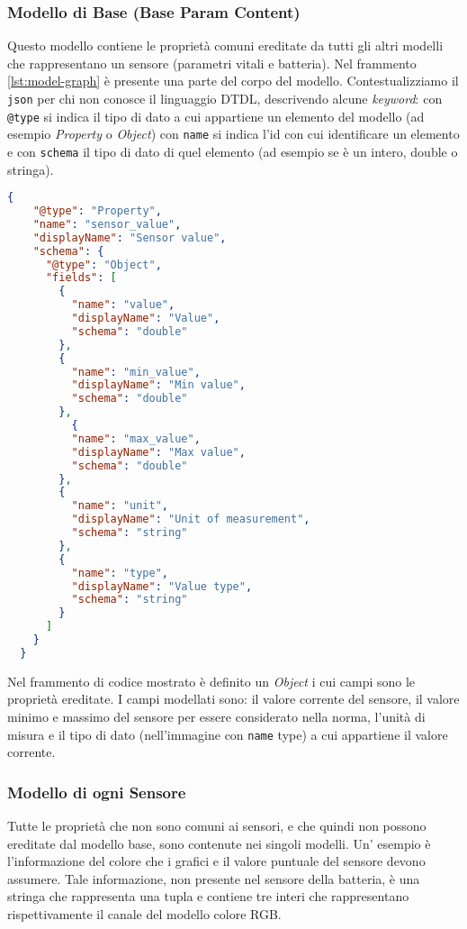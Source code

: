 \subsubsection{Modello di Base (Base Param Content)}
Questo modello contiene le proprietà comuni ereditate da tutti gli altri modelli che rappresentano un sensore (parametri vitali e batteria). Nel frammento \ref{lst:model-graph} è presente una parte del corpo del modello. Contestualizziamo il \texttt{json} per chi non conosce il linguaggio DTDL, descrivendo alcune \textit{keyword}: con \texttt{@type} si indica il tipo di dato a cui appartiene un elemento del modello (ad esempio \textit{Property} o \textit{Object}) con \texttt{name} si indica l'id con cui identificare un elemento e con \texttt{schema} il tipo di dato di quel elemento (ad esempio se è un intero, double o stringa).
\begin{lstlisting}[label={lst:model-graph}, caption={Proprietà comuni del modello Base Param Content ereditate dai modelli.}, language=json, firstnumber=1]
 {
    "@type": "Property",
    "name": "sensor_value",
    "displayName": "Sensor value",
    "schema": {
      "@type": "Object",
      "fields": [
        {
          "name": "value",
          "displayName": "Value",
          "schema": "double"
        },
        {
          "name": "min_value",
          "displayName": "Min value",
          "schema": "double"
        },
          {
          "name": "max_value",
          "displayName": "Max value",
          "schema": "double"
        },
        {
          "name": "unit",
          "displayName": "Unit of measurement",
          "schema": "string"
        },
        {
          "name": "type",
          "displayName": "Value type",
          "schema": "string"
        }
      ]
    }
  }
\end{lstlisting}
Nel frammento di codice mostrato è definito un \textit{Object} i cui campi sono le proprietà ereditate. I campi modellati sono: il valore corrente del sensore, il valore minimo e massimo del sensore per essere considerato nella norma, l'unità di misura e il tipo di dato (nell'immagine con \texttt{name} type) a cui appartiene il valore corrente. 

\subsubsection{Modello di ogni Sensore}
Tutte le proprietà che non sono comuni ai sensori, e che quindi non possono ereditate dal modello base, sono contenute nei singoli modelli. Un' esempio è l'informazione del colore che i grafici e il valore puntuale del sensore devono assumere. Tale informazione, non presente nel sensore della batteria, è una stringa che rappresenta una tupla e contiene tre interi che rappresentano rispettivamente il canale del modello colore RGB.

